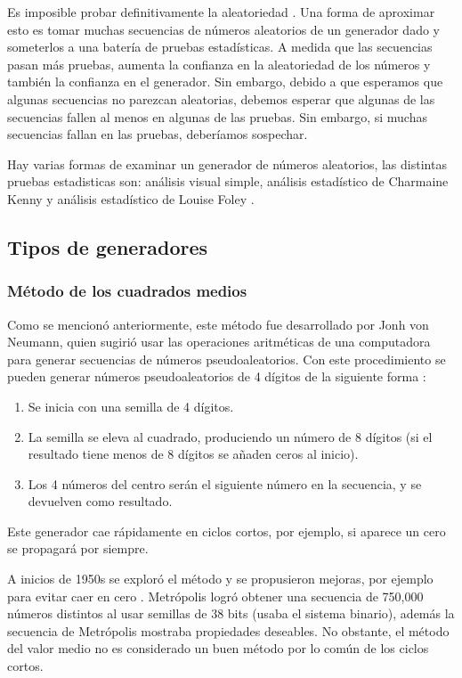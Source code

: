 Es imposible probar definitivamente la aleatoriedad \cite{randomorganalysis}. Una forma de aproximar esto es tomar muchas secuencias de números aleatorios de un generador dado y someterlos a una batería de pruebas estadísticas. A medida que las secuencias pasan más pruebas, aumenta la confianza en la aleatoriedad de los números y también la confianza en el generador. Sin embargo, debido a que esperamos que algunas secuencias no parezcan aleatorias, debemos esperar que algunas de las secuencias fallen al menos en algunas de las pruebas. Sin embargo, si muchas secuencias fallan en las pruebas, deberíamos sospechar.

Hay varias formas de examinar un generador de números aleatorios, las distintas pruebas estadisticas son: análisis visual simple, análisis estadístico de Charmaine Kenny y análisis estadístico de Louise Foley \cite{randomorganalysis}.

\subsection{Tipos de generadores}
\subsubsection{Método de los cuadrados medios}
Como se mencionó anteriormente, este método fue desarrollado por Jonh von Neumann, quien sugirió usar las operaciones aritméticas de una computadora para generar secuencias de números pseudoaleatorios. Con este procedimiento se pueden generar números pseudoaleatorios de 4 dígitos de la siguiente forma \cite{ortiz2018numeros}:
\begin{enumerate}
    \item Se inicia con una semilla de 4 dígitos.
    \item La semilla se eleva al cuadrado, produciendo un número de 8 dígitos (si el resultado tiene menos de 8 dígitos se añaden ceros al inicio). 
    \item Los 4 números del centro serán el siguiente número en la secuencia, y se devuelven como resultado. 
\end{enumerate}
Este generador cae rápidamente en ciclos cortos, por ejemplo, si aparece un cero se propagará por siempre.

A inicios de 1950s se exploró el método y se propusieron mejoras, por ejemplo para evitar caer en cero \cite{ortiz2018numeros}. Metrópolis logró obtener una secuencia de 750,000 números distintos al usar semillas de 38 bits (usaba el sistema binario), además la secuencia de Metrópolis mostraba propiedades deseables. No obstante, el método del valor medio no es considerado un buen método por lo común de los ciclos cortos.


